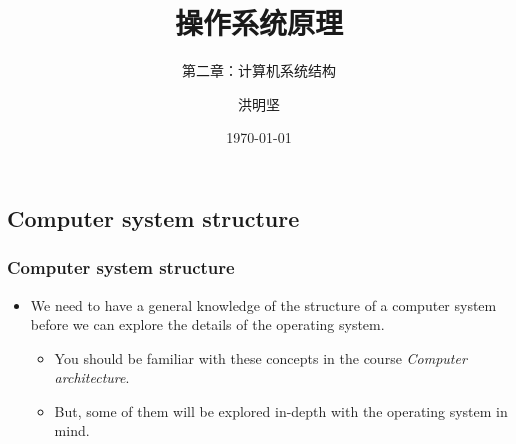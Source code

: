 \documentclass[CJKutf8,xcolor=pdftex,dvipsnames,table]{beamer}
\begin{document}
\begin{CJK*}{UTF8}{song}

  \title{ 操作系统原理}
  \subtitle{ 第二章：计算机系统结构}
  \author{ 洪明坚}
  \date{\today}


  \frame{\titlepage}


  \section{Computer system structure}

  \begin{frame}
    \frametitle{Computer system structure} \pause
    \begin{itemize}
    \item{We need to have a general knowledge of the structure of a computer system before we can explore the details of the operating system.} \pause
      \begin{itemize}
      \item{You should be familiar with these concepts in the course \emph{Computer architecture}. } \pause
      \item{But, some of them will be explored in-depth with the operating system in mind.} \pause
      \end{itemize}
    \end{itemize}
  \end{frame}


\end{CJK*}
\end{document}
